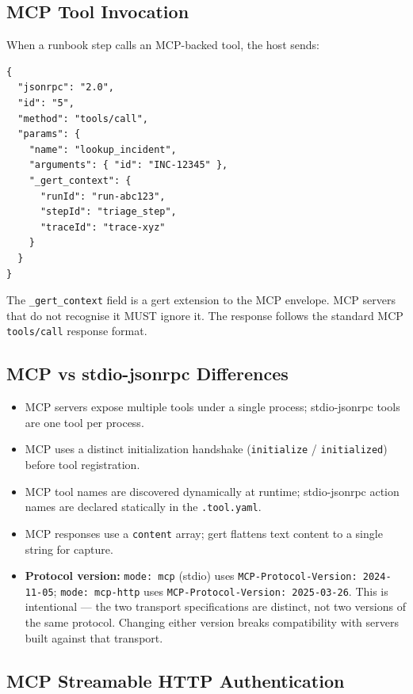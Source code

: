 \subsection{MCP Tool Invocation}

When a runbook step calls an MCP-backed tool, the host sends:

\begin{verbatim}
{
  "jsonrpc": "2.0",
  "id": "5",
  "method": "tools/call",
  "params": {
    "name": "lookup_incident",
    "arguments": { "id": "INC-12345" },
    "_gert_context": {
      "runId": "run-abc123",
      "stepId": "triage_step",
      "traceId": "trace-xyz"
    }
  }
}
\end{verbatim}

The \texttt{\_gert\_context} field is a gert extension to the MCP envelope.
MCP servers that do not recognise it MUST ignore it.  The response follows the
standard MCP \texttt{tools/call} response format.

\subsection{MCP vs stdio-jsonrpc Differences}

\begin{itemize}
  \item MCP servers expose multiple tools under a single process; stdio-jsonrpc
        tools are one tool per process.
  \item MCP uses a distinct initialization handshake (\texttt{initialize} /
        \texttt{initialized}) before tool registration.
  \item MCP tool names are discovered dynamically at runtime; stdio-jsonrpc
        action names are declared statically in the \texttt{.tool.yaml}.
  \item MCP responses use a \texttt{content} array; gert flattens text content
        to a single string for capture.
  \item \textbf{Protocol version:} \texttt{mode: mcp} (stdio) uses
        \texttt{MCP-Protocol-Version: 2024-11-05}; \texttt{mode: mcp-http}
        uses \texttt{MCP-Protocol-Version: 2025-03-26}.  This is intentional
        --- the two transport specifications are distinct, not two versions of
        the same protocol.  Changing either version breaks compatibility with
        servers built against that transport.
\end{itemize}

\subsection{MCP Streamable HTTP Authentication}
\label{sec:mcp-http-auth-detail}

